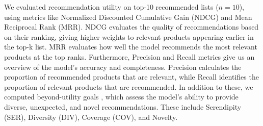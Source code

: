 \documentclass[sigconf]{acmart}
\begin{document}
\begin{table}[!t]
\caption{Interaction and knowledge information.}
\label{tab:data-stats}
\centering
\setlength{\tabcolsep}{3pt}
\vspace{-4mm}
\end{table}

We evaluated recommendation utility on top-10 recommended lists ($n=10$), using metrics like Normalized Discounted Cumulative Gain (NDCG) and Mean Reciprocal Rank (MRR). NDCG evaluates the quality of recommendations based on their ranking, giving higher weights to relevant products appearing earlier in the top-k list. MRR evaluates how well the model recommends the most relevant products at the top ranks. Furthermore, Precision and Recall metrics give us an overview of the model's accuracy and completeness. Precision calculates the proportion of recommended products that are relevant, while Recall identifies the proportion of relevant products that are recommended. In addition to these, we computed beyond-utility goals \cite{10.1145/2926720}, which assess the model's ability to provide diverse, unexpected, and novel recommendations. These include Serendipity (SER), Diversity (DIV), Coverage (COV), and Novelty. %
\end{document}
